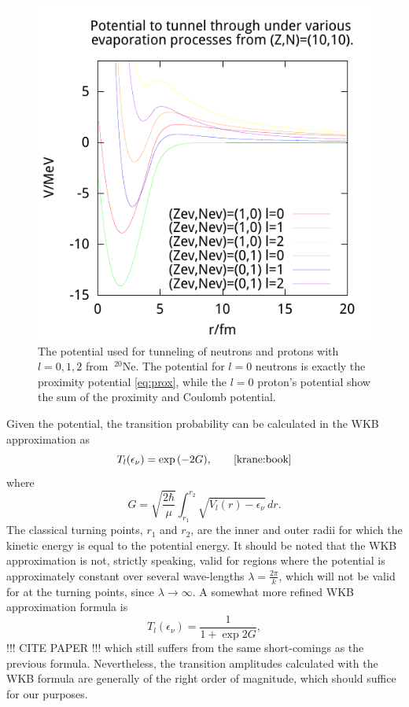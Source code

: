 \begin{figure}
\begin{center}
\includegraphics{figures/pot/np-potZ10N10.pdf}
\caption{\label{fig:np-Z10N10} The potential used for tunneling of neutrons and protons with $l=0,1,2$ from $~^{20}\mathrm{Ne}$. The potential for $l=0$ neutrons is exactly the proximity potential \eqref{eq:prox}, while the $l=0$ proton's potential show the sum of the proximity and Coulomb potential. }
\end{center}
\end{figure}

Given the potential, the transition probability can be calculated in the WKB approximation as 
\begin{equation}
T_l(\epsilon_\nu) = \exp{(-2G)},\qquad\cite{krane:book}
\end{equation}
where 
\begin{equation}
G=\sqrt{\frac{2\hbar}{\mu}} \int_{r_1}^{r_2} \sqrt{V_l(r)-\epsilon_{\nu}}\,dr.
\end{equation}
The classical turning points, $r_1$ and $r_2$, are the inner and outer radii for which the kinetic energy is equal to the potential energy. It should be noted that the WKB approximation is not, strictly speaking, valid for regions where the potential is approximately constant over several wave-lengths $\lambda=\frac{2\pi}{k}$, which will not be valid for at the turning points, since $\lambda \to \infty$. 
A somewhat more refined WKB approximation formula is
\begin{equation}
T_l(\epsilon_\nu) = \frac{1}{1+\exp{2G}},
\end{equation}
!!! CITE PAPER !!! which still suffers from the same short-comings as the previous formula. Nevertheless, the transition amplitudes calculated with the WKB formula are generally of the right order of magnitude, which should suffice for our purposes\cite{2011arXiv1106.1065N}.


